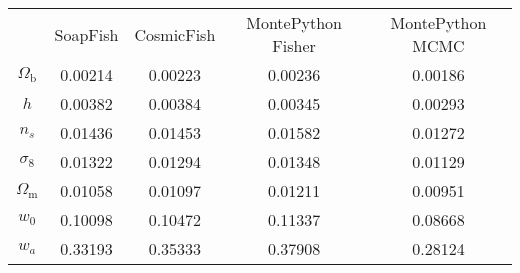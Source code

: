 \begin{table}
\centering
\begin{tabular}{|c|c|c|c|c|}
 & SoapFish & CosmicFish & MontePython Fisher & MontePython MCMC \\
$\Omega_\mathrm{b}$ & 0.00214 & 0.00223 & 0.00236 & 0.00186 \\
$h$ & 0.00382 & 0.00384 & 0.00345 & 0.00293 \\
$n_s$ & 0.01436 & 0.01453 & 0.01582 & 0.01272 \\
$\sigma_8$ & 0.01322 & 0.01294 & 0.01348 & 0.01129 \\
$\Omega_\mathrm{m}$ & 0.01058 & 0.01097 & 0.01211 & 0.00951 \\
$w_0$ & 0.10098 & 0.10472 & 0.11337 & 0.08668 \\
$w_a$ & 0.33193 & 0.35333 & 0.37908 & 0.28124 \\
\end{tabular}
\end{table}
